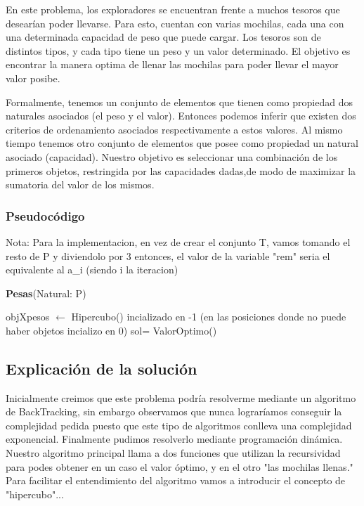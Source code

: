 \documentclass[spanish,12pt]{article}
\begin{document}
En este problema, los exploradores se encuentran frente a muchos tesoros que desearían poder llevarse. Para esto, cuentan con varias mochilas, cada una con una determinada capacidad de peso que puede cargar.
Los tesoros son de distintos tipos, y cada tipo tiene un peso y un valor determinado.
El objetivo es encontrar la manera optima de llenar las mochilas para poder llevar el mayor valor posibe.

Formalmente, tenemos un conjunto de elementos que tienen como propiedad dos naturales asociados (el peso y el valor). Entonces podemos inferir que existen dos criterios de ordenamiento asociados respectivamente a estos valores.
Al mismo tiempo tenemos otro conjunto de elementos que posee como propiedad un natural asociado (capacidad).
Nuestro objetivo es seleccionar una combinación de los primeros objetos, restringida por las capacidades dadas,de modo de maximizar la sumatoria del valor de los mismos.

\subsubsection{Pseudocódigo}
Nota: Para la implementacion, en vez de crear el conjunto T, vamos tomando el resto de P y diviendolo por 3 entonces, el valor de la variable "rem" seria el equivalente al a_i (siendo i la iteracion)

\begin{algorithm}[H]{\textbf{Pesas}(Natural: P)}
	\begin{algorithmic}[1]
		\State objXpesos $\gets$ Hipercubo() incializado en -1 (en las posiciones donde no puede haber objetos incializo en 0)
		\State sol= ValorOptimo()
	\end{algorithmic}
\end{algorithm}


\subsection{Explicación de la solución}

   Inicialmente creimos que este problema podría resolverme mediante un algoritmo de BackTracking, sin embargo observamos que nunca lograríamos conseguir la complejidad pedida puesto que este tipo de algoritmos conlleva una complejidad exponencial.
   Finalmente pudimos resolverlo mediante programación dinámica. Nuestro algoritmo principal llama a dos funciones que utilizan la recursividad para podes obtener en un caso el valor óptimo, y en el otro "las mochilas llenas."
   Para facilitar el entendimiento del algoritmo vamos a introducir el concepto de "hipercubo"...%
\end{document}
